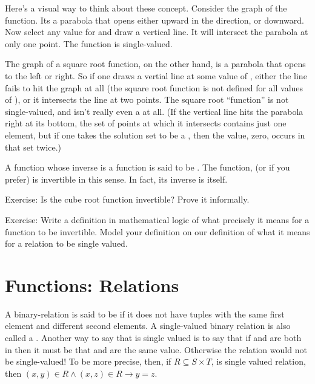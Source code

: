 \documentclass[letterpaper,10pt,english]{sphinxmanual}
\begin{document}
Here’s a visual way to think about these concept. Consider the graph
of the  function. Its a parabola that opens either upward in
the  direction, or downward. Now select any value for  and draw
a vertical line. It will intersect the parabola at only one point.
The function is single-valued.

The graph of a square root function, on the other hand, is a parabola
that opens to the left or right. So if one draws a vertial line at
some value of , either the line fails to hit the graph at all (the
square root function is not defined for all values of ), or it
intersects the line at two points. The square root “function” is not
single-valued, and isn’t really even a  at all. (If the
vertical line hits the parabola right at its bottom, the set of points
at which it intersects contains just one element, but if one takes the
solution set to be a , then the value, zero, occurs in that
set twice.)

A function whose inverse is a function is said to be .
The function,  (or  if you prefer) is invertible in
this sense. In fact, its inverse is itself.

Exercise: Is the cube root function invertible? Prove it informally.

Exercise: Write a definition in mathematical logic of what precisely
it means for a function to be invertible. Model your definition on our
definition of what it means for a relation to be single valued.


\section{Functions:  Relations}
\label{\detokenize{07-set-theory:functions-single-valued-relations}}
A binary-relation is said to be  if it does not have
tuples with the same first element and different second elements.  A
single-valued binary relation is also called a .  Another
way to say that  is single valued is to say that if  and
 are both in  then it must be that  and  are the same
value. Otherwise the relation would not be single-valued! To be more
precise, then, if \(R \subseteq S \times T\), is single valued
relation, then \((x, y) \in R \land (x, z) \in R \rightarrow y =
z\).
\end{document}
